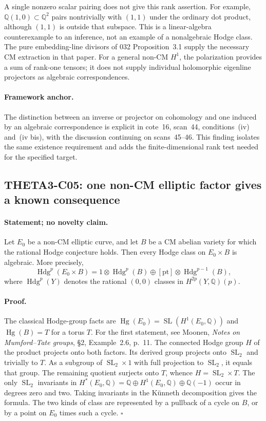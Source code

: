 \documentclass[11pt]{article}
\newcommand{\Q}{\mathbb Q}\newcommand{\C}{\mathbb C}\newcommand{\Z}{\mathbb Z}\newcommand{\R}{\mathbb R}\newcommand{\A}{\mathbb A}\newcommand{\OO}{\mathcal O}
\newcommand{\Hdg}{\operatorname{Hdg}}\newcommand{\CH}{\operatorname{CH}}\newcommand{\Hom}{\operatorname{Hom}}\newcommand{\Tr}{\operatorname{Tr}}\newcommand{\SU}{\operatorname{SU}}\newcommand{\U}{\operatorname{U}}
\theoremstyle{definition}\newtheorem{definition}[theorem]{Definition}\newtheorem{remark}[theorem]{Remark}
\begin{document}
A single nonzero scalar pairing does not give this rank assertion.
For example, $\Q(1,0)\subset\Q^2$ pairs nontrivially with $(1,1)$
under the ordinary dot product, although $(1,1)$ is outside that
subspace. This is a linear-algebra counterexample to an inference,
not an example of a nonalgebraic Hodge class. The pure embedding-line
divisors of 032 Proposition~3.1 supply the necessary CM extraction
in that paper. For a general non-CM $H^1$, the polarization provides
a sum of rank-one tensors; it does not supply individual
holomorphic eigenline projectors as algebraic correspondences.

\paragraph{Framework anchor.}
The distinction between an inverse or projector on cohomology and one
induced by an algebraic correspondence is explicit in cote~16,
scan~44, conditions~(iv) and~(iv bis), with the discussion continuing on
scans~45--46.  This finding isolates the same existence requirement and
adds the finite-dimensional rank test needed for the specified target.

\subsection{THETA3-C05: one non-CM elliptic factor gives a known consequence}\label{C05}

\paragraph{Statement; no novelty claim.}
Let $E_0$ be a non-CM elliptic curve, and let $B$ be a CM abelian
variety for which the rational Hodge conjecture holds. Then every
Hodge class on $E_0\times B$ is algebraic. More precisely,
\[
 \Hdg^p(E_0\times B)
 =1\otimes\Hdg^p(B)
 \oplus[\mathrm{pt}]\otimes\Hdg^{p-1}(B),
\]
where $\Hdg^p(Y)$ denotes the rational $(0,0)$ classes in
$H^{2p}(Y,\Q)(p)$.

\paragraph{Proof.}
The classical Hodge-group facts are
$\operatorname{Hg}(E_0)=\operatorname{SL}(H^1(E_0,\Q))$ and
$\operatorname{Hg}(B)=T$ for a torus $T$. For the first statement,
see Moonen, \emph{Notes on Mumford--Tate groups}, \S2,
Example~2.6, p.~11. The connected Hodge group $H$ of the product
projects onto both factors. Its derived group projects onto
$\operatorname{SL}_2$ and trivially to $T$. As a subgroup of
$\operatorname{SL}_2\times1$ with full projection to
$\operatorname{SL}_2$, it equals that group. The remaining quotient
surjects onto $T$, whence $H=\operatorname{SL}_2\times T$.
The only $\operatorname{SL}_2$ invariants in
$H^*(E_0,\Q)=\Q\oplus H^1(E_0,\Q)\oplus\Q(-1)$ occur in degrees
zero and two. Taking invariants in the K\"unneth decomposition gives
the formula. The two kinds of class are represented by a pullback of
a cycle on $B$, or by a point on $E_0$ times such a cycle. $\square$
\end{document}
